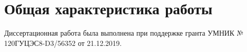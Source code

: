\section*{Общая характеристика работы}

\newcommand{\actuality}{\pdfbookmark[1]{Актуальность}{actuality}\underline{\textbf{\actualityTXT}}}
\newcommand{\progress}{\pdfbookmark[1]{Разработанность темы}{progress}\underline{\textbf{\progressTXT}}}
\newcommand{\aim}{\pdfbookmark[1]{Цели}{aim}\underline{{\textbf\aimTXT}}}
\newcommand{\tasks}{\pdfbookmark[1]{Задачи}{tasks}\underline{\textbf{\tasksTXT}}}
\newcommand{\aimtasks}{\pdfbookmark[1]{Цели и задачи}{aimtasks}\aimtasksTXT}
\newcommand{\novelty}{\pdfbookmark[1]{Научная новизна}{novelty}\underline{\textbf{\noveltyTXT}}}
\newcommand{\influence}{\pdfbookmark[1]{Практическая значимость}{influence}\underline{\textbf{\influenceTXT}}}
\newcommand{\methods}{\pdfbookmark[1]{Методология и методы исследования}{methods}\underline{\textbf{\methodsTXT}}}
\newcommand{\defpositions}{\pdfbookmark[1]{Положения, выносимые на защиту}{defpositions}\underline{\textbf{\defpositionsTXT}}}
\newcommand{\reliability}{\pdfbookmark[1]{Достоверность}{reliability}\underline{\textbf{\reliabilityTXT}}}
\newcommand{\probation}{\pdfbookmark[1]{Апробация}{probation}\underline{\textbf{\probationTXT}}}
\newcommand{\contribution}{\pdfbookmark[1]{Личный вклад}{contribution}\underline{\textbf{\contributionTXT}}}
\newcommand{\publications}{\pdfbookmark[1]{Публикации}{publications}\underline{\textbf{\publicationsTXT}}}


Диссертационная работа была выполнена при поддержке гранта УМНИК № 120ГУЦЭС8-D3/56352 от 21.12.2019. 


